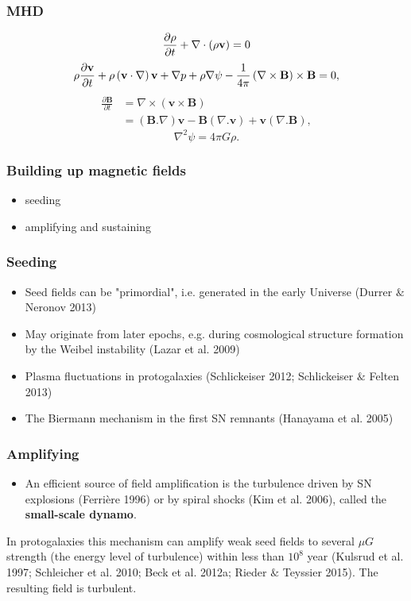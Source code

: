 \documentclass[10pt,aspectratio=169]{beamer}
\newcommand{\bvec}[1]{{\bf #1}}
\begin{document}
\begin{frame}
\frametitle{MHD}
	\begin{align}
		\frac{\partial \rho}{\partial t} + \nabla\cdot\left(\rho\bvec{v}\right) = 0
	\end{align}
	\begin{align}
		\rho\frac{\partial \mathbf{v}}{\partial t} + \rho\left(\bvec{v}\cdot\nabla\right) \bvec{v}
		+ \nabla p + \rho\nabla\psi
		- \dfrac{1}{4\pi}\left(\nabla\times\bvec{B}\right)\times\bvec{B} = 0,
	\end{align}
	\begin{align}
		\frac{\partial \mathbf{B}}{\partial t} &= \nabla \times \left( \mathbf{v} \times \mathbf{B} \right) \\
		&= (\mathbf{B} . \nabla) \mathbf{v} - \mathbf{B}(\nabla . \mathbf{v}) + \mathbf{v}(\nabla . \mathbf{B}),
	\end{align}
	\begin{equation}
		\nabla^{2}\psi = 4\pi G \rho.
	\end{equation}
\end{frame}
\begin{frame}
	\frametitle{Building up magnetic fields}
	\begin{itemize}
		\item seeding
		\item amplifying and sustaining
	\end{itemize}
\end{frame}
\begin{frame}
	\frametitle{Seeding}
	\begin{itemize}
		\item Seed fields can be "primordial", i.e. generated in the early Universe (Durrer $\&$ Neronov 2013)
		\item May originate from later epochs, e.g. during cosmological structure formation by the Weibel instability (Lazar et al. 2009)
		\item Plasma fluctuations in protogalaxies (Schlickeiser 2012; Schlickeiser $\&$ Felten 2013)
		\item The Biermann mechanism in the first SN remnants (Hanayama et al. 2005)
	\end{itemize}
\end{frame}
\begin{frame}
	\frametitle{Amplifying}
	\begin{itemize}
		\item An efficient source of field amplification is the turbulence driven by SN explosions (Ferrière 1996) or by spiral shocks (Kim et al. 2006), called the \textbf{small-scale dynamo}.
	\end{itemize}
	In protogalaxies this mechanism can amplify weak seed fields to several $\mu G$ strength (the energy level of turbulence) within less than $10^8$ year (Kulsrud et al. 1997; Schleicher et al. 2010; Beck et al. 2012a; Rieder $\&$ Teyssier 2015). The resulting field is turbulent.
\end{frame}
\end{document}
